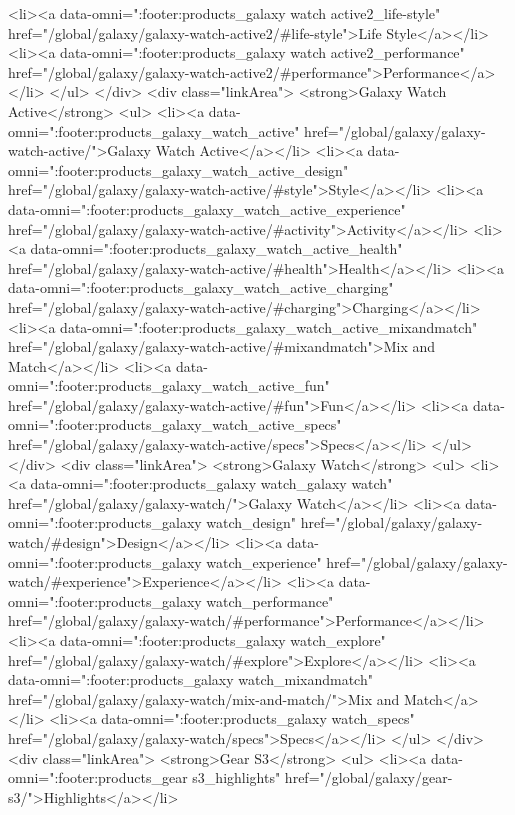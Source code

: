 {{{{{{{{{{{{{{{{{{{{{{{{{{{{{{{{{{{{{{{{{{{{{{{{{{{{{				<li><a data-omni=":footer:products_galaxy watch active2_life-style" href="/global/galaxy/galaxy-watch-active2/#life-style">Life Style</a></li>
				<li><a data-omni=":footer:products_galaxy watch active2_performance" href="/global/galaxy/galaxy-watch-active2/#performance">Performance</a></li>
			</ul>
		</div>
		<div class="linkArea">
			<strong>Galaxy Watch Active</strong>
			<ul>
				<li><a data-omni=":footer:products_galaxy_watch_active" href="/global/galaxy/galaxy-watch-active/">Galaxy Watch Active</a></li>
				<li><a data-omni=":footer:products_galaxy_watch_active_design" href="/global/galaxy/galaxy-watch-active/#style">Style</a></li>
				<li><a data-omni=":footer:products_galaxy_watch_active_experience" href="/global/galaxy/galaxy-watch-active/#activity">Activity</a></li>
				<li><a data-omni=":footer:products_galaxy_watch_active_health" href="/global/galaxy/galaxy-watch-active/#health">Health</a></li>
				<li><a data-omni=":footer:products_galaxy_watch_active_charging" href="/global/galaxy/galaxy-watch-active/#charging">Charging</a></li>
				<li><a data-omni=":footer:products_galaxy_watch_active_mixandmatch" href="/global/galaxy/galaxy-watch-active/#mixandmatch">Mix and Match</a></li>
				<li><a data-omni=":footer:products_galaxy_watch_active_fun" href="/global/galaxy/galaxy-watch-active/#fun">Fun</a></li>
				<li><a data-omni=":footer:products_galaxy_watch_active_specs" href="/global/galaxy/galaxy-watch-active/specs">Specs</a></li>
			</ul>
		</div>
		<div class="linkArea">
			<strong>Galaxy Watch</strong>
			<ul>
				<li><a data-omni=":footer:products_galaxy watch_galaxy watch" href="/global/galaxy/galaxy-watch/">Galaxy Watch</a></li>
				<li><a data-omni=":footer:products_galaxy watch_design" href="/global/galaxy/galaxy-watch/#design">Design</a></li>
				<li><a data-omni=":footer:products_galaxy watch_experience" href="/global/galaxy/galaxy-watch/#experience">Experience</a></li>
				<li><a data-omni=":footer:products_galaxy watch_performance" href="/global/galaxy/galaxy-watch/#performance">Performance</a></li>
				<li><a data-omni=":footer:products_galaxy watch_explore" href="/global/galaxy/galaxy-watch/#explore">Explore</a></li>
				<li><a data-omni=":footer:products_galaxy watch_mixandmatch" href="/global/galaxy/galaxy-watch/mix-and-match/">Mix and Match</a></li>
				<li><a data-omni=":footer:products_galaxy watch_specs" href="/global/galaxy/galaxy-watch/specs">Specs</a></li>
			</ul>
		</div>
		<div class="linkArea">
			<strong>Gear S3</strong>
			<ul>
				<li><a data-omni=":footer:products_gear s3_highlights" href="/global/galaxy/gear-s3/">Highlights</a></li>
}}}}}}}}}}}}}}}}}}}}}}}}}}}}}}}}}}}}}}}}}}}}}}}}}}}}}
